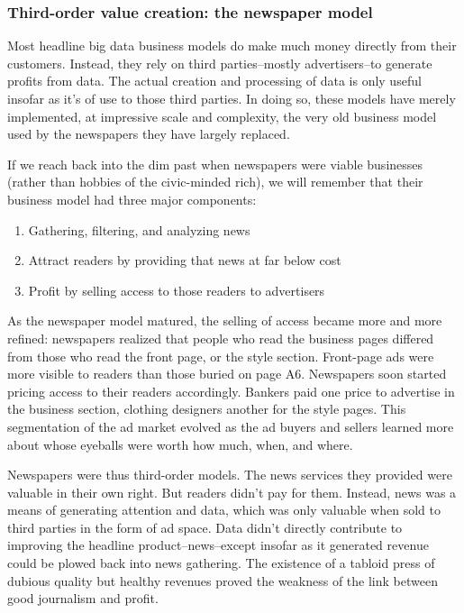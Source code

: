 \documentclass[12pt]{article}
\begin{document}
\subsubsection{Third-order value creation: the newspaper model}
\label{sec:third-order-value}

Most headline big data business models do make much money directly from
their customers. Instead, they rely on third parties--mostly
advertisers--to generate profits from data. The actual creation and
processing of data is only useful insofar as it's of use to those
third parties. In doing so, these models have merely implemented, at
impressive scale and complexity, the very old business model used by
the newspapers they have largely replaced.

If we reach back into the dim past when newspapers were viable
businesses (rather than hobbies of the civic-minded rich), we will
remember that their business model had three major components:

\begin{enumerate}
\item Gathering, filtering, and analyzing news
\item Attract readers by providing that news at far below cost
\item Profit by selling access to those readers to advertisers
\end{enumerate}

As the newspaper model matured, the selling of access became more and
more refined: newspapers realized that people who read the business
pages differed from those who read the front page, or the style
section. Front-page ads were more visible to readers than those buried
on page A6. Newspapers soon started pricing access to their readers
accordingly. Bankers paid one price to advertise in the business
section, clothing designers another for the style pages. This
segmentation of the ad market evolved as the ad buyers and sellers
learned more about whose eyeballs were worth how much, when, and
where.

Newspapers were thus third-order models. The news services they
provided were valuable in their own right. But readers didn't pay for
them. Instead, news was a means of generating attention and data,
which was only valuable when sold to third parties in the form of ad
space. Data didn't directly contribute to improving the headline
product--news--except insofar as it generated revenue could be plowed
back into news gathering. The existence of a tabloid press of dubious
quality but healthy revenues proved the weakness of the link between
good journalism and profit.
\end{document}
